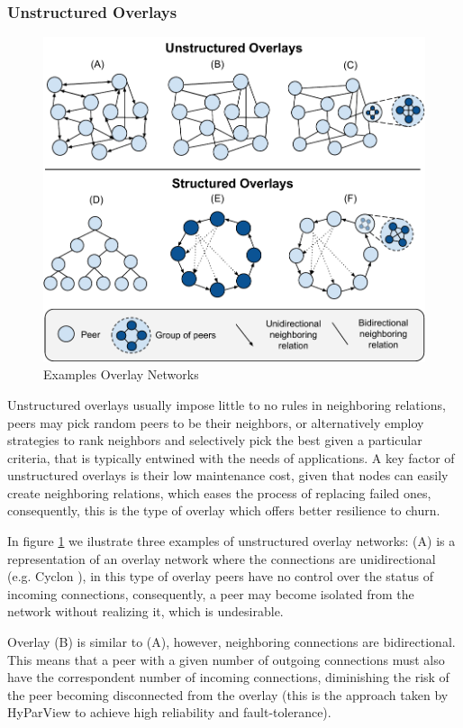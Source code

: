 \subsubsection*{Unstructured Overlays}

\begin{figure}
    \centering
    \includegraphics[width=0.60\linewidth]{Figures/overlay_networks.pdf}
    \caption{Examples Overlay Networks}
    \label{fig:overlay_networks}
\end{figure}

Unstructured overlays usually impose little to no rules in neighboring relations, peers may pick random peers to be their neighbors, or alternatively employ strategies to rank neighbors and selectively pick the best given a particular criteria, that is typically entwined with the needs of applications. A key factor of unstructured overlays is their low maintenance cost, given that nodes can easily create neighboring relations, which eases the process of replacing failed ones, consequently, this is the type of overlay which offers better resilience to churn.

In figure \ref{fig:overlay_networks} we ilustrate three examples of unstructured overlay networks: (A) is a representation of an overlay network where the connections are unidirectional (e.g. Cyclon \cite{jelasity2007gossip}), in this type of overlay peers have no control over the status of incoming connections, consequently, a peer may become isolated from the network without realizing it, which is undesirable. 

Overlay (B) is similar to (A), however, neighboring connections are bidirectional. This means that a peer with a given number of outgoing connections must also have the correspondent number of incoming connections, diminishing the risk of the peer becoming disconnected from the overlay (this is the approach taken by HyParView \cite{Hyparview} to achieve high reliability and fault-tolerance).

